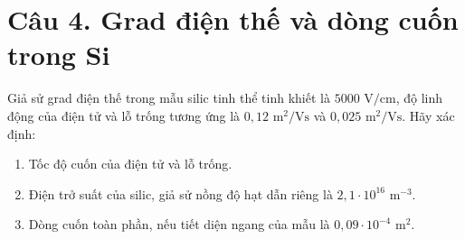 \documentclass[11pt,a4paper]{article}
\begin{document}
\vspace{0.5cm}

\section*{Câu 4. Grad điện thế và dòng cuốn trong Si}

Giả sử grad điện thế trong mẫu silic tinh thể tinh khiết là $5000\text{ V/cm}$, độ linh động của điện tử và lỗ trống tương ứng là $0{,}12\text{ m}^2/\text{Vs}$ và $0{,}025\text{ m}^2/\text{Vs}$. Hãy xác định:

\begin{enumerate}[label=\alph*., leftmargin=*]
    \item Tốc độ cuốn của điện tử và lỗ trống.
    \item Điện trở suất của silic, giả sử nồng độ hạt dẫn riêng là $2{,}1 \cdot 10^{16}\text{ m}^{-3}$.
    \item Dòng cuốn toàn phần, nếu tiết diện ngang của mẫu là $0{,}09 \cdot 10^{-4}\text{ m}^2$.
\end{enumerate}
\end{document}
